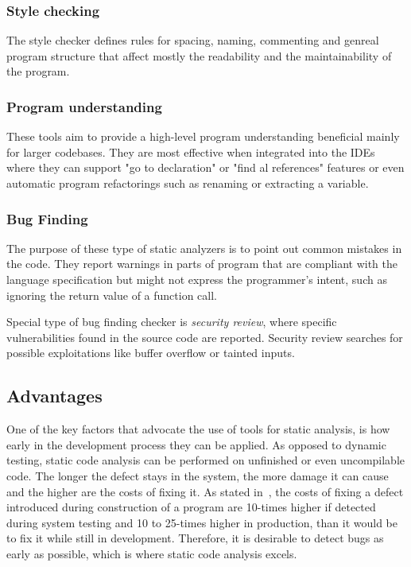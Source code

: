 \documentclass[
  digital, %
  table,   %
  lof,     %
  lot,     %
  oneside,
]{fithesis3}
\begin{document}
\subsubsection{Style checking}
The style checker defines rules for spacing, naming, commenting and genreal program structure that affect mostly the readability and the maintainability of the program. 

\subsubsection{Program understanding}
These tools aim to provide a high-level program understanding beneficial mainly for larger codebases. They are most effective when integrated into the IDEs where they can support "go to declaration" or "find al references" features or even automatic program refactorings such as renaming or extracting a variable.

\subsubsection{Bug Finding}
The  purpose of these type of static analyzers is to point out common mistakes in the code. They report warnings in parts of program that are compliant with the language specification but might not express the programmer's intent, such as ignoring the return value of a function call.

Special type of bug finding checker is \textit{security review}, where specific vulnerabilities found in the source code are reported. Security review searches for possible exploitations like buffer overflow or tainted inputs.
  
\subsection{Advantages}
One of the key factors that advocate the use of tools for static analysis, is how early in the development process they can be applied. As opposed to dynamic testing, static code analysis can be performed on unfinished or even uncompilable code. The longer the defect stays in the system, the more damage it can cause and the higher are the costs of fixing it. As stated in~\cite[p. 29]{code-complete}, the costs of fixing a defect introduced during construction of a program are 10-times higher if detected during system testing and 10 to 25-times higher in production, than it would be to fix it while still in development. Therefore, it is desirable to detect bugs as early as possible, which is where static code analysis excels.
\end{document}
